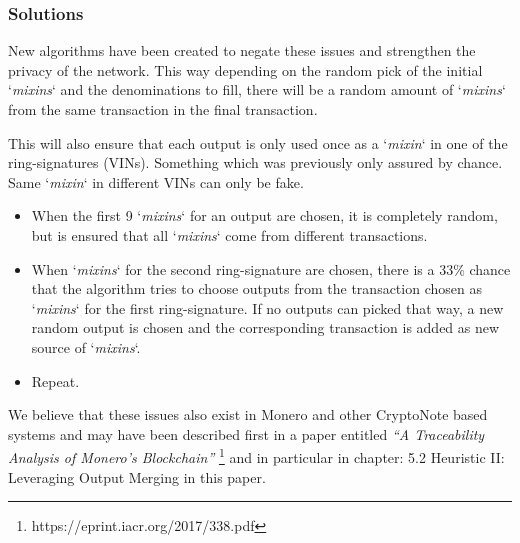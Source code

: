 \subsubsection{Solutions}
New algorithms have been created to negate these issues and strengthen the
privacy of the network. This way depending on the random pick of the initial
‘\textit{mixins}‘ and the denominations to fill, there will be a random
amount of ‘\textit{mixins}‘ from the same transaction in the final transaction.



This will also ensure that each output is only used once as a ‘\textit{mixin}‘
in one of the ring-signatures (VINs). Something which was previously only
assured by chance. Same ‘\textit{mixin}‘ in different VINs can only be fake.



\begin{itemize}
	\item When the first 9 ‘\textit{mixins}‘ for an output are chosen, it is
	completely random, but is ensured that all ‘\textit{mixins}‘ come from
	different transactions.
	\item When ‘\textit{mixins}‘ for the second ring-signature are chosen,
	there is a 33\% chance that the algorithm tries to 	choose outputs from
	the transaction chosen as ‘\textit{mixins}‘ for the first ring-signature.
	If no outputs can 	picked that way, a new random output is chosen and
	the corresponding transaction is added as new source of ‘\textit{mixins}‘.
	\item Repeat.
\end{itemize}



We believe that these issues also exist in Monero and other CryptoNote based
systems and may have been described first in a paper entitled
\textit{“A Traceability Analysis of Monero’s Blockchain”}
\footnote{https://eprint.iacr.org/2017/338.pdf} and in particular in
chapter: 5.2 Heuristic II: Leveraging Output Merging in this paper.
